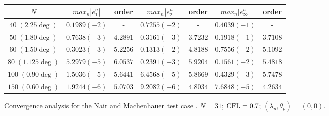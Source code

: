 \begin{figure}
\label{table:2.4}
\begin{tabular}{c||cc|cc|cc}
$N$ & $max_n |e_1^n|$ & order  & $max_n |e_2^n|$ & order  & $max_n |e_{\infty}^n|$ & order \\
\hline
\hline
$40\;(2.25\deg)$ & $0.1989 (-2)$ & -  & $0.7255 (-2)$ & - & $0.4039(-1)$  & - \\
\hline 
$50\;(1.80\deg)$ & $0.7638 (-3)$ & $4.2891$ & $0.3161(-3)$ & $3.7232$ & $0.1918 (-1)$ & $3.7108$ \\
\hline
$60\;(1.50\deg)$ & $0.3023(-3)$ & $5.2256$ & $0.1313 (-2)$ & $4.8188$ & $0.7556 (-2)$ & $5.1092$ \\
\hline
$80\;(1.125\deg)$ & $5.2979 (-5)$ & $6.0537$ & $0.2391(-3)$ & $5.9204$ & $0.1561(-2)$ & $5.4818$ \\
\hline
$100\;(0.90\deg)$ & $1.5036(-5)$ & $5.6441$ & $6.4568(-5)$ & $5.8669$ & $0.4329(-3)$ & $5.7478$\\
\hline
$150\;(0.60\deg)$ & $1.9244(-6)$ & $5.0703$ & $9.2082(-6)$ & $4.8034$ & $7.6848(-5)$ & $4.2634$
\end{tabular}
\caption{Convergence analysis for the Nair and Machenhauer test case \cite{Nair-Machenhauer}. 
$N=31$; $\mathop{\rm CFL}\nolimits = 0.7$; $(\lambda_p, \theta_p) = (0,0)$.}
\end{figure}
